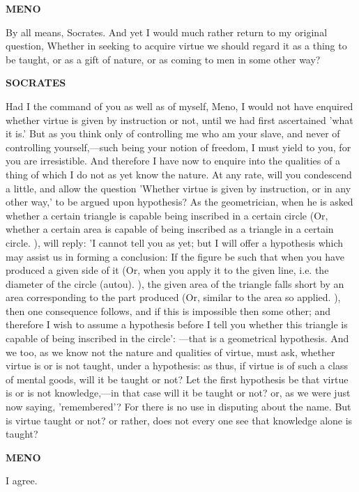 \documentclass[11pt,letter]{article}
\begin{document}
\par \textbf{MENO}
\par   By all means, Socrates. And yet I would much rather return to my original question, Whether in seeking to acquire virtue we should regard it as a thing to be taught, or as a gift of nature, or as coming to men in some other way?

\par \textbf{SOCRATES}
\par   Had I the command of you as well as of myself, Meno, I would not have enquired whether virtue is given by instruction or not, until we had first ascertained 'what it is.' But as you think only of controlling me who am your slave, and never of controlling yourself,—such being your notion of freedom, I must yield to you, for you are irresistible. And therefore I have now to enquire into the qualities of a thing of which I do not as yet know the nature. At any rate, will you condescend a little, and allow the question 'Whether virtue is given by instruction, or in any other way,' to be argued upon hypothesis? As the geometrician, when he is asked whether a certain triangle is capable being inscribed in a certain circle (Or, whether a certain area is capable of being inscribed as a triangle in a certain circle. ), will reply:  'I cannot tell you as yet; but I will offer a hypothesis which may assist us in forming a conclusion:  If the figure be such that when you have produced a given side of it (Or, when you apply it to the given line, i.e. the diameter of the circle (autou). ), the given area of the triangle falls short by an area corresponding to the part produced (Or, similar to the area so applied. ), then one consequence follows, and if this is impossible then some other; and therefore I wish to assume a hypothesis before I tell you whether this triangle is capable of being inscribed in the circle': —that is a geometrical hypothesis. And we too, as we know not the nature and qualities of virtue, must ask, whether virtue is or is not taught, under a hypothesis:  as thus, if virtue is of such a class of mental goods, will it be taught or not? Let the first hypothesis be that virtue is or is not knowledge,—in that case will it be taught or not? or, as we were just now saying, 'remembered'? For there is no use in disputing about the name. But is virtue taught or not? or rather, does not every one see that knowledge alone is taught?

\par \textbf{MENO}
\par   I agree.
\end{document}
